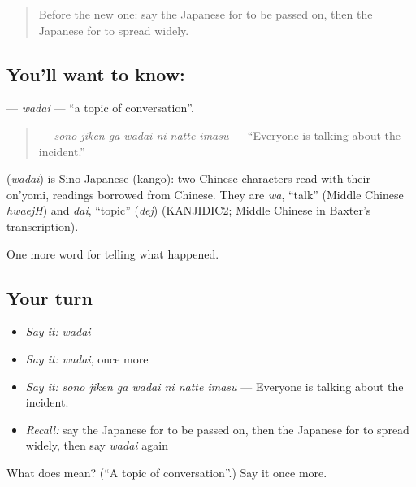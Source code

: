 \begin{quote}
Before the new one: say the Japanese for to be passed on, then the Japanese for to spread widely.
\end{quote}

\subsection*{You'll want to know: }
\textbf{} — \emph{wadai} — \textquotedblleft{}a topic of conversation\textquotedblright{}.

\begin{quote}
\textbf{   } — \emph{sono jiken ga wadai ni natte imasu} — \textquotedblleft{}Everyone is talking about the incident.\textquotedblright{}
\end{quote}

\begin{cousinweb}
\textbf{} (\emph{wadai}) is Sino-Japanese (kango): two Chinese characters read with their on'yomi, readings borrowed from Chinese. They are \emph{wa}, \textquotedblleft{}talk\textquotedblright{} (Middle Chinese \emph{hwaejH}) and \emph{dai}, \textquotedblleft{}topic\textquotedblright{} (\emph{dej}) (KANJIDIC2; Middle Chinese in Baxter's transcription).
\end{cousinweb}

\begin{grammarlens}[title={What you've built}]
One more word for telling what happened.
\end{grammarlens}

\subsection*{Your turn}
\begin{itemize}
\raggedright
  \item \emph{Say it:} \emph{wadai}
  \item \emph{Say it:} \emph{wadai}, once more
  \item \emph{Say it:} \emph{sono jiken ga wadai ni natte imasu} — Everyone is talking about the incident.
  \item \emph{Recall:} say the Japanese for to be passed on, then the Japanese for to spread widely, then say \emph{wadai} again
\end{itemize}

\begin{tcolorbox}[breakable,colback=teal!4,colframe=teal!35!black,title={Before you move on}]
What does  mean? (\textquotedblleft{}A topic of conversation\textquotedblright{}.) Say it once more.
\end{tcolorbox}
